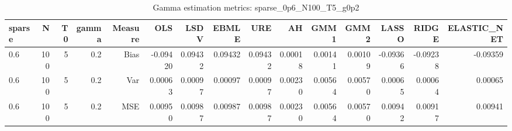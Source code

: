 \begin{table}[!htbp]\centering
\caption{Gamma estimation metrics: sparse_0p6_N100_T5_g0p2}
\label{tab:table1_sparse_0p6_N100_T5_g0p2}
\begin{tabular}{lrrrrrrrrrrrrrr}
\hline
sparse & N & T0 & gamma & Measure & OLS & LSDV & EBMLE & URE & AH & GMM1 & GMM2 & LASSO & RIDGE & ELASTIC_NET \\
\hline
0.6 & 100 & 5 & 0.2 & Bias & -0.09420 & 0.09432 & 0.09432 & 0.09432 & 0.00018 & 0.00141 & 0.00109 & -0.09366 & -0.09238 & -0.09359 \\
0.6 & 100 & 5 & 0.2 & Var & 0.00063 & 0.00097 & 0.00097 & 0.00097 & 0.00230 & 0.00564 & 0.00570 & 0.00065 & 0.00064 & 0.00065 \\
0.6 & 100 & 5 & 0.2 & MSE & 0.00950 & 0.00987 & 0.00987 & 0.00987 & 0.00230 & 0.00564 & 0.00570 & 0.00942 & 0.00917 & 0.00941 \\
\hline
\end{tabular}
\end{table}

